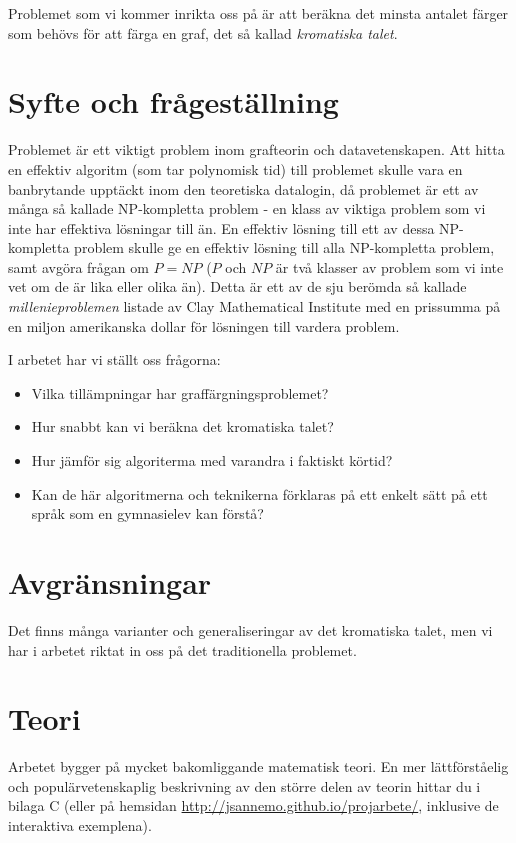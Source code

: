 \documentclass[a4paper]{report}
\begin{document}
Problemet som vi kommer inrikta oss på är att beräkna det minsta antalet färger som behövs för att färga en graf, det så kallad \emph{kromatiska talet}.

\section{Syfte och frågeställning}
Problemet är ett viktigt problem inom grafteorin och datavetenskapen. Att hitta en effektiv algoritm (som tar polynomisk tid) till problemet skulle vara en banbrytande upptäckt inom den teoretiska datalogin, då problemet är ett av många så kallade NP-kompletta problem - en klass av viktiga problem som vi inte har effektiva lösningar till än. En effektiv lösning till
ett av dessa NP-kompletta problem skulle ge en effektiv lösning till alla NP-kompletta problem, samt avgöra frågan om $P = NP$ ($P$ och $NP$ är två klasser av problem som vi inte vet om de är lika eller olika än). Detta är ett av de sju berömda så kallade \emph{millenieproblemen} listade av Clay Mathematical Institute  med en prissumma på en miljon amerikanska dollar för lösningen till vardera problem.

I arbetet har vi ställt oss frågorna:
\begin{itemize}
\item Vilka tillämpningar har graffärgningsproblemet?
\item Hur snabbt kan vi beräkna det kromatiska talet?
\item Hur jämför sig algoriterma med varandra i faktiskt körtid?
\item Kan de här algoritmerna och teknikerna förklaras på ett enkelt sätt på ett språk som en gymnasielev kan förstå?
\end{itemize}

\section{Avgränsningar}
Det finns många varianter och generaliseringar av det kromatiska talet, men vi har i arbetet riktat in oss på det traditionella problemet.

\section{Teori}

Arbetet bygger på mycket bakomliggande matematisk teori. En mer lättförståelig och populärvetenskaplig beskrivning av den större delen av teorin hittar du i bilaga C (eller på hemsidan \url{http://jsannemo.github.io/projarbete/}, inklusive de interaktiva exemplena).
\end{document}
